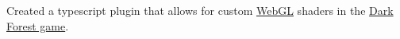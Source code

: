 {Created a typescript plugin that allows for custom \href{https://developer.mozilla.org/en-US/docs/Web/API/WebGL_API}{WebGL} shaders in the \href{https://zkga.me/}{Dark Forest game}.}
